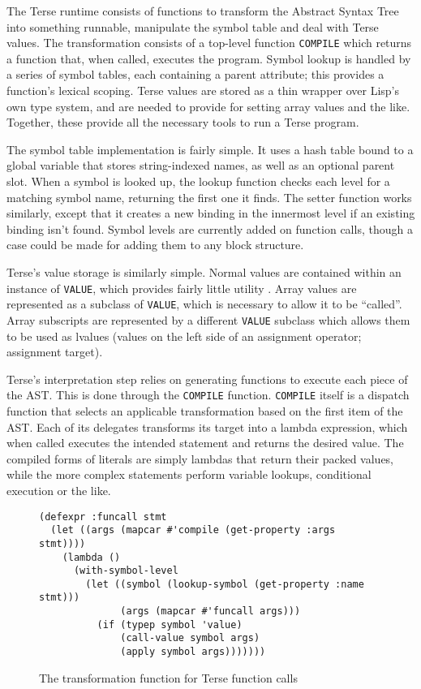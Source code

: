 \documentclass[12pt]{article}
\newcommand{\code}[1]{\texttt{#1}}
\begin{document}
The Terse runtime consists of functions to transform the Abstract
Syntax Tree into something runnable, manipulate the symbol table and
deal with Terse values. The transformation consists of a top-level
function \code{COMPILE} which returns a function that, when called,
executes the program. Symbol lookup is handled by a series of symbol
tables, each containing a parent attribute; this provides a function's
lexical scoping. Terse values are stored as a thin wrapper over Lisp's
own type system, and are needed to provide for setting array values
and the like. Together, these provide all the necessary tools to run a
Terse program.

The symbol table implementation is fairly simple. It uses a hash table
bound to a global variable that stores string-indexed names, as well
as an optional parent slot. When a symbol is looked up, the lookup
function checks each level for a matching symbol name, returning the
first one it finds. The setter function works similarly, except that
it creates a new binding in the innermost level if an existing binding
isn't found. Symbol levels are currently added on function calls,
though a case could be made for adding them to any block structure.

Terse's value storage is similarly simple. Normal values are contained
within an instance of \code{VALUE}, which provides fairly little
utility . Array values are represented as a subclass of
\code{VALUE}, which is necessary to allow it to be ``called''. Array
subscripts are represented by a different \code{VALUE} subclass which
allows them to be used as lvalues (values on the left side of an
assignment operator; assignment target).

Terse's interpretation step relies on generating functions to execute
each piece of the AST. This is done through the \code{COMPILE}
function. \code{COMPILE} itself is a dispatch function that selects an
applicable transformation based on the first item of the AST. Each of
its delegates transforms its target into a lambda expression, which
when called executes the intended statement and returns the desired
value. The compiled forms of literals are simply lambdas that return
their packed values, while the more complex statements perform
variable lookups, conditional execution or the like.

\begin{figure}
\begin{verbatim}
(defexpr :funcall stmt
  (let ((args (mapcar #'compile (get-property :args stmt))))
    (lambda ()
      (with-symbol-level
        (let ((symbol (lookup-symbol (get-property :name stmt)))
              (args (mapcar #'funcall args)))
          (if (typep symbol 'value)
              (call-value symbol args)
              (apply symbol args)))))))
\end{verbatim}
\caption{The transformation function for Terse function calls}
\end{figure}
\end{document}
